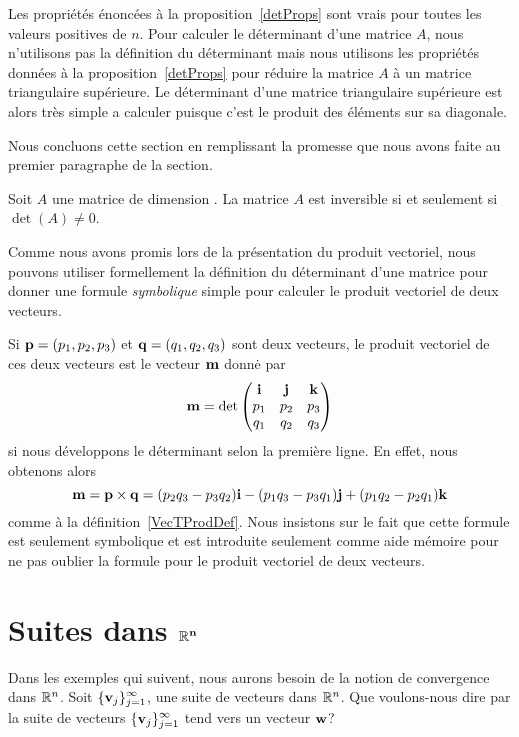 {Les propriétés énoncées à la proposition~\ref{detProps} sont vrais
pour toutes les valeurs positives de $n$.  Pour calculer le
déterminant d'une matrice $A$, nous n'utilisons pas la définition du
déterminant mais nous utilisons les propriétés données à la
proposition~\ref{detProps} pour réduire la matrice $A$ à un matrice
triangulaire supérieure.  Le déterminant d'une matrice triangulaire
supérieure est alors très simple a calculer puisque c'est le produit des
éléments sur sa diagonale.

Nous concluons cette section en remplissant la promesse que nous avons
faite au premier paragraphe de la section.

\begin{theorem} \label{AinvDetNN}
Soit $A$ une matrice de dimension \nn.  La matrice $A$ est inversible
si et seulement si $\det(A) \neq 0$.
\end{theorem}

\begin{rmk}
Comme nous avons promis lors de la présentation du produit vectoriel,
nous pouvons utiliser formellement la définition du déterminant d'une
matrice  pour donner une formule {\em symbolique} simple pour
calculer le produit vectoriel de deux vecteurs.

Si $\mathbf{p} = (p_1,p_2,p_3)$ et $\mathbf{q} = (q_1, q_2, q_3)$ sont deux
vecteurs, le produit vectoriel de ces deux vecteurs est le vecteur
$\mathbf{m}$ donnė par
\[
\mathbf{m} = \det \begin{pmatrix}
\mathbf{i} & \mathbf{j} & \mathbf{k} \\
p_1 & p_2 & p_3 \\
q_1 & q_2 & q_3 
\end{pmatrix}
\]
si nous développons le déterminant selon la première ligne.  En effet, nous
obtenons alors
\[
\mathbf{m} = \mathbf{p} \times \mathbf{q}
= (p_2 q_3 - p_3 q_2) \mathbf{i} - (p_1 q_3 - p_3 q_1) \mathbf{j}
+ (p_1 q_2 - p_2 q_1) \mathbf{k}
\]
comme à la définition~\ref{VecTProdDef}.  Nous insistons sur le fait que
cette formule est seulement symbolique et est introduite seulement
comme aide mémoire pour ne pas oublier la formule pour le
produit vectoriel de deux vecteurs.
\label{DetermVectProd}
\end{rmk}
\section{Suites dans $\mathbf{\mathbb{R}^n}$}

Dans les exemples qui suivent, nous aurons besoin de la notion de
convergence dans $\mathbb{R}^n$.  Soit
$\displaystyle \{ \mathbf{v}_j \}_{j=1}^\infty$, une suite 
de vecteurs dans $\mathbb{R}^n$.  Que voulons-nous dire par la suite de
vecteurs $\displaystyle \{ \mathbf{v}_j \}_{j=1}^\infty$ tend vers un
vecteur $\mathbf{w}$? 

}
